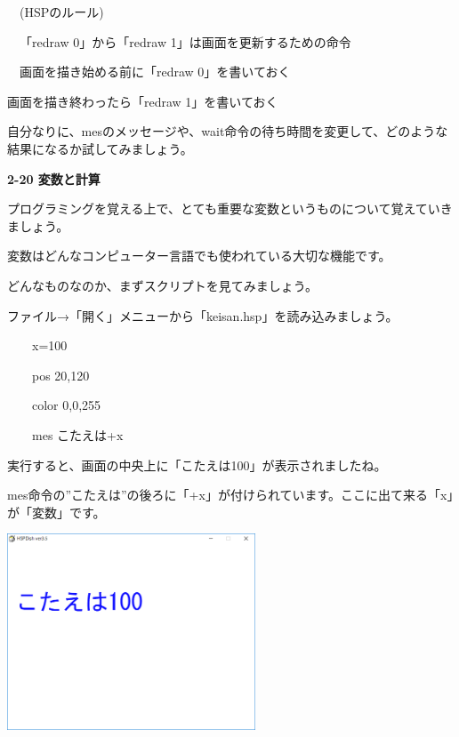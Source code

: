 \documentclass[a4paper,dvipdfmx]{jarticle}
\begin{document}
\bigskip

\ \ (HSPのルール)


\bigskip

\ \ 「redraw 0」から「redraw
1」は画面を更新するための命令

\ \ 画面を描き始める前に「redraw
0」を書いておく

画面を描き終わったら「redraw
1」を書いておく


\bigskip

自分なりに、mesのメッセージや、wait命令の待ち時間を変更して、どのような結果になるか試してみましょう。


\bigskip


\bigskip


\bigskip


\bigskip


\bigskip


\bigskip


\bigskip


\bigskip


\bigskip


\bigskip


\bigskip


\bigskip

{\bfseries
2-20 変数と計算}


\bigskip

プログラミングを覚える上で、とても重要な変数というものについて覚えていきましょう。

変数はどんなコンピューター言語でも使われている大切な機能です。

どんなものなのか、まずスクリプトを見てみましょう。

ファイル→「開く」メニューから「keisan.hsp」を読み込みましょう。


\bigskip

\ \ \ \ x=100

\ \ \ \ pos 20,120

\ \ \ \ color 0,0,255

\ \ \ \ mes {\textquotedbl}こたえは{\textquotedbl}+x


\bigskip

実行すると、画面の中央上に「こたえは100」が表示されましたね。

mes命令の”こたえは”の後ろに「+x」が付けられています。ここに出て来る「x」が「変数」です。


\bigskip



\begin{center}
\includegraphics[width=7.382cm,height=5.831cm]{text02-img/text02-img044.png}

\end{center}
\end{document}
